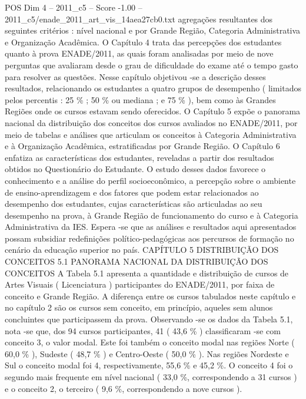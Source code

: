 \begin{textsample}{POS Dim 4 – 2011\_c5 – Score -1.00 – 2011\_c5/enade\_2011\_art\_vis\_14aea27cb0.txt}  \label{ex:f4_pos_246}
agregações resultantes dos seguintes critérios : nível nacional e por Grande Região, Categoria Administrativa e Organização Acadêmica.
O Capítulo 4 trata das percepções dos estudantes quanto à prova ENADE/2011, as quais foram analisadas por meio de nove perguntas que avaliaram desde o grau de dificuldade do exame até o tempo gasto para resolver as questões.
Nesse capítulo objetivou -se a descrição desses resultados, relacionando os estudantes a quatro grupos de desempenho ( limitados pelos percentis : 25 \% ; 50 \% ou mediana ; e 75 \% ), bem como às Grandes Regiões onde os cursos estavam sendo oferecidos.
O Capítulo 5 expõe o panorama nacional da distribuição dos conceitos dos cursos avaliados no ENADE/2011, por meio de tabelas e análises que articulam os conceitos à Categoria Administrativa e à Organização Acadêmica, estratificadas por Grande Região.
O Capítulo 6 enfatiza as características dos estudantes, reveladas a partir dos resultados obtidos no Questionário do Estudante.
O estudo desses dados favorece o conhecimento e a análise do perfil socioeconômico, a percepção sobre o ambiente de ensino-aprendizagem e dos fatores que podem estar relacionados ao desempenho dos estudantes, cujas características são articuladas ao seu desempenho na prova, à Grande Região de funcionamento do curso e à Categoria Administrativa da IES.
Espera -se que as análises e resultados aqui apresentados possam subsidiar redefinições político-pedagógicas aos percursos de formação no cenário da educação superior no país.
CAPÍTULO 5 DISTRIBUIÇÃO DOS CONCEITOS 5.1 PANORAMA NACIONAL DA DISTRIBUIÇÃO DOS CONCEITOS A Tabela 5.1 apresenta a quantidade e distribuição de cursos de Artes Visuais ( Licenciatura ) participantes do ENADE/2011, por faixa de conceito e Grande Região.
A diferença entre os cursos tabulados neste capítulo e no capítulo 2 são os cursos sem conceito, em princípio, aqueles sem alunos concluintes que participassem da prova.
Observando -se os dados da Tabela 5.1, nota -se que, dos 94 cursos participantes, 41 ( 43,6 \% ) classificaram -se com conceito 3, o valor modal.
Este foi também o conceito modal nas regiões Norte ( 60,0 \% ), Sudeste ( 48,7 \% ) e Centro-Oeste ( 50,0 \% ).
Nas regiões Nordeste e Sul o conceito modal foi 4, respectivamente, 55,6 \% e 45,2 \%.
O conceito 4 foi o segundo mais frequente em nível nacional ( 33,0 \%, correspondendo a 31 cursos ) e o conceito 2, o terceiro ( 9,6 \%, correspondendo a nove cursos ).

\end{textsample}
